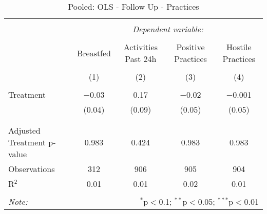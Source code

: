 
\begin{table}[!htbp] \centering 
  \caption{Pooled: OLS - Follow Up - Practices} 
  \label{tbl:Pooled: OLS - Follow Up - Practices} 
\begin{tabular}{@{\extracolsep{5pt}}lcccc} 
\\[-1.8ex]\hline 
\hline \\[-1.8ex] 
 & \multicolumn{4}{c}{\textit{Dependent variable:}} \\ 
\cline{2-5} 
\\[-1.8ex] & Breastfed & Activities Past 24h & Positive Practices & Hostile Practices \\ 
\\[-1.8ex] & (1) & (2) & (3) & (4)\\ 
\hline \\[-1.8ex] 
 Treatment & $-$0.03 & 0.17 & $-$0.02 & $-$0.001 \\ 
  & (0.04) & (0.09) & (0.05) & (0.05) \\ 
  & & & & \\ 
\hline \\[-1.8ex] 
Adjusted Treatment p-value & 0.983 & 0.424 & 0.983 & 0.983 \\ 
Observations & 312 & 906 & 905 & 904 \\ 
R$^{2}$ & 0.01 & 0.01 & 0.02 & 0.01 \\ 
\hline 
\hline \\[-1.8ex] 
\textit{Note:}  & \multicolumn{4}{r}{$^{*}$p$<$0.1; $^{**}$p$<$0.05; $^{***}$p$<$0.01} \\ 
\end{tabular} 
\end{table} 
